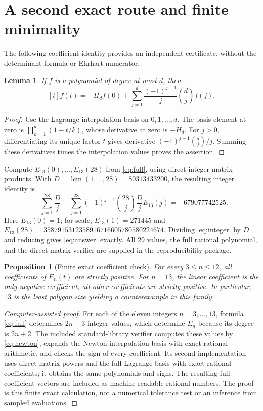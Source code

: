 \documentclass[11pt,letterpaper]{article}
\newtheorem{lemma}[theorem]{Lemma}
\newtheorem{proposition}[theorem]{Proposition}
\begin{document}
\section{A second exact route and finite minimality}\label{sec:independent}
The following coefficient identity provides an independent certificate, without the determinant formula or Ehrhart numerator.

\begin{lemma}\label{lem:lagrange}
If $f$ is a polynomial of degree at most $d$, then
\begin{equation}\label{eq:lagrange}
 [t]f(t)=-H_df(0)+\sum_{j=1}^d\frac{(-1)^{j-1}}{j}\binom dj f(j).
\end{equation}
\end{lemma}
\begin{proof}
Use the Lagrange interpolation basis on $0,1,\ldots,d$. The basis element at zero is $\prod_{k=1}^d(1-t/k)$, whose derivative at zero is $-H_d$. For $j>0$, differentiating its unique factor $t$ gives derivative $(-1)^{j-1}\binom dj/j$. Summing these derivatives times the interpolation values proves the assertion.
\end{proof}

Compute $E_{13}(0),\ldots,E_{13}(28)$ from \eqref{eq:full}, using direct integer matrix products. With $D=\operatorname{lcm}(1,\ldots,28)=80313433200$, the resulting integer identity is
\begin{equation}\label{eq:integer}
 -\sum_{j=1}^{28}\frac Dj+
 \sum_{j=1}^{28}(-1)^{j-1}\binom{28}{j}\frac Dj E_{13}(j)
 =-679077742525.
\end{equation}
Here $E_{13}(0)=1$; for scale, $E_{13}(1)=271445$ and
$E_{13}(28)=3587915312358916716605780580224674$.
Dividing \eqref{eq:integer} by $D$ and reducing gives \eqref{eq:answer} exactly. All 29 values, the full rational polynomial, and the direct-matrix verifier are supplied in the reproducibility package.

\begin{proposition}[Finite exact coefficient check]\label{prop:minimal}
For every $3\leq n\leq12$, all coefficients of $E_n(t)$ are strictly positive. For $n=13$, the linear coefficient is the only negative coefficient; all other coefficients are strictly positive. In particular, $13$ is the least polygon size yielding a counterexample in this family.
\end{proposition}
\begin{proof}[Computer-assisted proof]
For each of the eleven integers $n=3,\ldots,13$, formula \eqref{eq:full} determines $2n+3$ integer values, which determine $E_n$ because its degree is $2n+2$. The included standard-library verifier computes these values by \eqref{eq:newton}, expands the Newton interpolation basis with exact rational arithmetic, and checks the sign of every coefficient. Its second implementation uses direct matrix powers and the full Lagrange basis with exact rational coefficients; it obtains the same polynomials and signs. The resulting full coefficient vectors are included as machine-readable rational numbers. The proof is this finite exact calculation, not a numerical tolerance test or an inference from sampled evaluations.
\end{proof}
\end{document}
